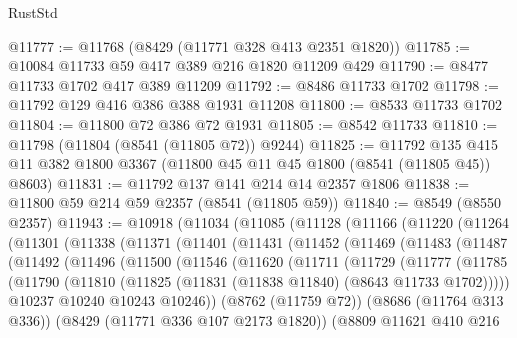 \begin{lexlean}{RustStd}
\begin{coremodule}
@11777 := @11768 (@8429 (@11771 @328 @413 @2351 @1820))
@11785 := @10084 @11733 @59 @417 @389 @216 @1820 @11209 @429
@11790 := @8477 @11733 @1702 @417 @389 @11209
@11792 := @8486 @11733 @1702
@11798 := @11792 @129 @416 @386 @388 @1931 @11208
@11800 := @8533 @11733 @1702
@11804 := @11800 @72 @386 @72 @1931
@11805 := @8542 @11733
@11810 := @11798 (@11804 (@8541 (@11805 @72)) @9244)
@11825 := @11792
    @135
    @415
    @11
    @382
    @1800
    @3367
    (@11800 @45 @11 @45 @1800 (@8541 (@11805 @45)) @8603)
@11831 := @11792 @137 @141 @214 @14 @2357 @1806
@11838 := @11800 @59 @214 @59 @2357 (@8541 (@11805 @59))
@11840 := @8549 (@8550 @2357)
@11943 := @10918
    (@11034
      (@11085
        (@11128
          (@11166
            (@11220
              (@11264
                (@11301
                  (@11338
                    (@11371
                      (@11401
                        (@11431
                          (@11452
                            (@11469
                              (@11483
                                (@11487
                                  (@11492
                                    (@11496
                                      (@11500
                                        (@11546
                                          (@11620
                                            (@11711
                                              (@11729
                                                (@11777
                                                  (@11785
                                                    (@11790
                                                      (@11810
                                                        (@11825
                                                          (@11831
                                                            (@11838 @11840)
                                                            (@8643 @11733 @1702)))))
                                                    @10237
                                                    @10240
                                                    @10243
                                                    @10246))
                                                (@8762 (@11759 @72))
                                                (@8686 (@11764 @313 @336))
                                                (@8429 (@11771 @336 @107 @2173 @1820))
                                                (@8809
                                                  @11621
                                                  @410
                                                  @216

\end{coremodule}
\end{lexlean}
